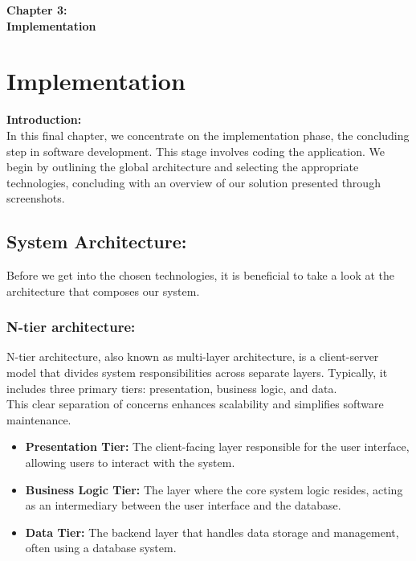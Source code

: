 \newpage
\thispagestyle{empty}
\vspace*{\fill}
\begin{center}
    {\Huge \textbf{Chapter 3:}}\\[0.8cm]
    {\Huge \textbf{Implementation}}
\end{center}
\vspace*{\fill}


\chapter{Implementation}

{\Large \textbf{Introduction:}}\\

In this final chapter, we concentrate on the implementation phase, the concluding step in software development. This stage involves coding the application. We begin by outlining the global architecture and selecting the appropriate technologies, concluding with an overview of our solution presented through screenshots.\\

\section{System Architecture:}

Before we get into the chosen technologies, it is beneficial to take a look at the architecture that composes our system.

\subsection{N-tier architecture:}

N-tier architecture, also known as multi-layer architecture, is a client-server model that divides system responsibilities across separate layers. Typically, it includes three primary tiers: presentation, business logic, and data.\\

This clear separation of concerns enhances scalability and simplifies software maintenance.

\begin{itemize}[label=\textbullet]
    \item \textbf{Presentation Tier:} The client-facing layer responsible for the user interface, allowing users to interact with the system.
    \item \textbf{Business Logic Tier:} The layer where the core system logic resides, acting as an intermediary between the user interface and the database.
    \item \textbf{Data Tier:} The backend layer that handles data storage and management, often using a database system.
\end{itemize}

